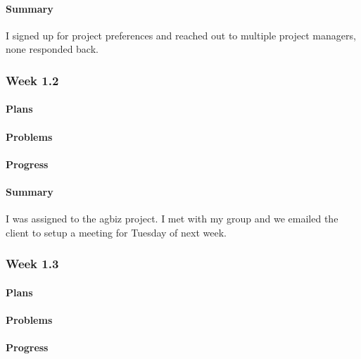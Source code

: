 \documentclass[onecolumn, draftclsnofoot,10pt, compsoc]{article}
\begin{document}
		    \paragraph{Summary} \hfill \break
		         I signed up for project preferences and reached out to multiple project managers, none responded back. \\

		\subsubsection{Week 1.2}

		    \paragraph{Plans} \hfill \break

		    \paragraph{Problems} \hfill \break

		    \paragraph{Progress} \hfill \break

		    \paragraph{Summary} \hfill \break
		        I was assigned to the agbiz project. I met with my group and we emailed the client to setup a meeting for Tuesday of next week.
		    \\

		\subsubsection{Week 1.3}

		    \paragraph{Plans} \hfill \break

		    \paragraph{Problems} \hfill \break

		    \paragraph{Progress} \hfill \break
\end{document}
